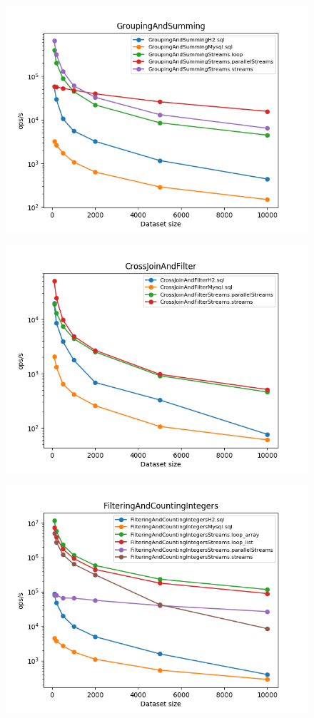 \documentclass[12pt]{extarticle}
\begin{document}
\begin{figure}[H]
\centering
\includegraphics[width=13cm]{plots/GroupingAndSumming}
\end{figure}

\begin{figure}[H]
\centering
\includegraphics[width=13cm]{plots/CrossJoinAndFilter}
\end{figure}

\begin{figure}[H]
\centering
\includegraphics[width=13cm]{plots/FilteringAndCountingIntegers}
\end{figure}
\end{document}
